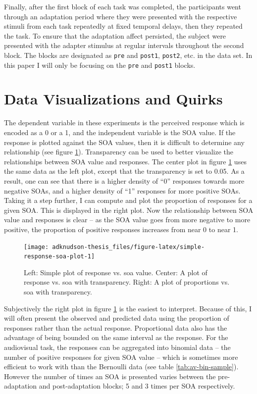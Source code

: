\documentclass[
]{report}
\begin{document}
Finally, after the first block of each task was completed, the participants went through an adaptation period where they were presented with the respective stimuli from each task repeatedly at fixed temporal delays, then they repeated the task. To ensure that the adaptation affect persisted, the subject were presented with the adapter stimulus at regular intervals throughout the second block. The blocks are designated as \texttt{pre} and \texttt{post1}, \texttt{post2}, etc. in the data set. In this paper I will only be focusing on the \texttt{pre} and \texttt{post1} blocks.

\hypertarget{data-visualizations-and-quirks}{%
\section{Data Visualizations and Quirks}\label{data-visualizations-and-quirks}}

The dependent variable in these experiments is the perceived response which is encoded as a 0 or a 1, and the independent variable is the SOA value. If the response is plotted against the SOA values, then it is difficult to determine any relationship (see figure \ref{fig:simple-response-soa-plot}). Transparency can be used to better visualize the relationships between SOA value and responses. The center plot in figure \ref{fig:simple-response-soa-plot} uses the same data as the left plot, except that the transparency is set to 0.05. As a result, one can see that there is a higher density of ``0'' responses towards more negative SOAs, and a higher density of ``1'' responses for more positive SOAs. Taking it a step further, I can compute and plot the proportion of responses for a given SOA. This is displayed in the right plot. Now the relationship between SOA value and responses is clear -- as the SOA value goes from more negative to more positive, the proportion of positive responses increases from near 0 to near 1.

\begin{figure}

{\centering \texttt{[image: adknudson-thesis\_files/figure-latex/simple-response-soa-plot-1]} 

}

\caption{Left: Simple plot of response vs. soa value. Center: A plot of response vs. soa with transparency. Right: A plot of proportions vs. soa with transparency.}\label{fig:simple-response-soa-plot}
\end{figure}

Subjectively the right plot in figure \ref{fig:simple-response-soa-plot} is the easiest to interpret. Because of this, I will often present the observed and predicted data using the proportion of responses rather than the actual response. Proportional data also has the advantage of being bounded on the same interval as the response. For the audiovisual task, the responses can be aggregated into binomial data -- the number of positive responses for given SOA value -- which is sometimes more efficient to work with than the Bernoulli data (see table \ref{tab:av-bin-sample}). However the number of times an SOA is presented varies between the pre-adaptation and post-adaptation blocks; 5 and 3 times per SOA respectively.
\end{document}
